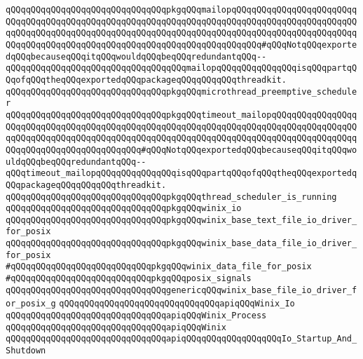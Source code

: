 \newline
\verb|qQQqqQQqqQQqqQQqqQQqqQQqqQQqqQQqpkgqQQqmailopqQQqqQQqqQQqqQQqqQQqqQQqqQQqqQQqqQQqqQQqqQQqqQQqqQQqqQQqqQQqqQQqqQQqqQQqqQQqqQQqqQQqqQQqqQQqqQQqqQQqqQQqqQQqqQQqqQQqqQQqqQQqqQQqqQQqqQQqqQQqqQQqqQQqqQQqqQQqqQQqqQQqqQQqqQQqqQQqqQQqqQQqqQQqqQQqqQQqqQQqqQQqqQQqqQQqqQQq#qQQqNotqQQqexportedqQQqbecauseqQQqitqQQqwouldqQQqbeqQQqredundantqQQq--qQQqqQQqqQQqqQQqqQQqqQQqqQQqqQQqqQQqmailopqQQqqQQqqQQqqQQqisqQQqpartqQQqofqQQqtheqQQqexportedqQQqpackageqQQqqQQqqQQqthreadkit.|\newline
\verb|qQQqqQQqqQQqqQQqqQQqqQQqqQQqqQQqpkgqQQqmicrothread_preemptive_scheduler|\newline
\verb|qQQqqQQqqQQqqQQqqQQqqQQqqQQqqQQqpkgqQQqtimeout_mailopqQQqqQQqqQQqqQQqqQQqqQQqqQQqqQQqqQQqqQQqqQQqqQQqqQQqqQQqqQQqqQQqqQQqqQQqqQQqqQQqqQQqqQQqqQQqqQQqqQQqqQQqqQQqqQQqqQQqqQQqqQQqqQQqqQQqqQQqqQQqqQQqqQQqqQQqqQQqqQQqqQQqqQQqqQQqqQQqqQQqqQQq#qQQqNotqQQqexportedqQQqbecauseqQQqitqQQqwouldqQQqbeqQQqredundantqQQq--qQQqtimeout_mailopqQQqqQQqqQQqqQQqisqQQqpartqQQqofqQQqtheqQQqexportedqQQqpackageqQQqqQQqqQQqthreadkit.|\newline
\verb|qQQqqQQqqQQqqQQqqQQqqQQqqQQqqQQqpkgqQQqthread_scheduler_is_running|\newline
\verb|qQQqqQQqqQQqqQQqqQQqqQQqqQQqqQQqpkgqQQqwinix_io|\newline
\verb|qQQqqQQqqQQqqQQqqQQqqQQqqQQqqQQqpkgqQQqwinix_base_text_file_io_driver_for_posix|\newline
\verb|qQQqqQQqqQQqqQQqqQQqqQQqqQQqqQQqpkgqQQqwinix_base_data_file_io_driver_for_posix|\newline
\verb|#qQQqqQQqqQQqqQQqqQQqqQQqqQQqpkgqQQqwinix_data_file_for_posix|\newline
\verb|#qQQqqQQqqQQqqQQqqQQqqQQqqQQqpkgqQQqposix_signals|\newline
\newline
\verb|qQQqqQQqqQQqqQQqqQQqqQQqqQQqqQQqgenericqQQqwinix_base_file_io_driver_for_posix_g|\newline
\newline
\verb|qQQqqQQqqQQqqQQqqQQqqQQqqQQqqQQqapiqQQqWinix_Io|\newline
\verb|qQQqqQQqqQQqqQQqqQQqqQQqqQQqqQQqapiqQQqWinix_Process|\newline
\verb|qQQqqQQqqQQqqQQqqQQqqQQqqQQqqQQqapiqQQqWinix|\newline
\newline
\verb|qQQqqQQqqQQqqQQqqQQqqQQqqQQqqQQqapiqQQqqQQqqQQqqQQqqQQqIo_Startup_And_Shutdown|\newline
